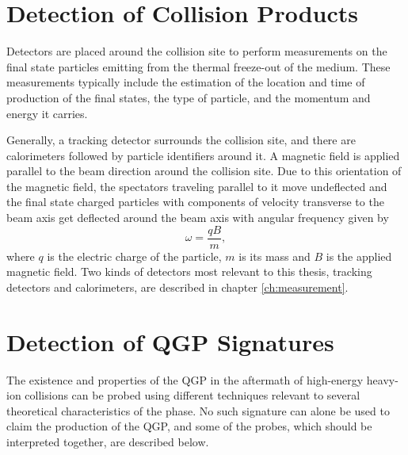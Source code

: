 \section{Detection of Collision Products}\label{subsection:detection}
Detectors are placed around the collision site to perform measurements on the final state particles emitting from the thermal freeze-out of the medium. These measurements typically include the estimation of the location and time of production of the final states, the type of particle, and the momentum and energy it carries.

Generally, a tracking detector surrounds the collision site, and there are calorimeters followed by particle identifiers around it. A magnetic field is applied parallel to the beam direction around the collision site. Due to this orientation of the magnetic field, the spectators traveling parallel to it move undeflected and the final state charged particles with components of velocity transverse to the beam axis get deflected around the beam axis with angular frequency given by
\begin{equation}\label{eqn:larmor}
\omega = \frac{qB}{m},
\end{equation}
where $q$ is the electric charge of the particle, $m$ is its mass and $B$ is the applied magnetic field.
Two kinds of detectors most relevant to this thesis, tracking detectors and calorimeters, are described in chapter \ref{ch:measurement}.

\section{Detection of QGP Signatures}\label{section:signatures}

The existence and properties of the QGP in the aftermath of high-energy heavy-ion collisions can be probed using different techniques relevant to several theoretical characteristics of the phase. No such signature can alone be used to claim the production of the QGP, and some of the probes, which should be interpreted together, are described below.



